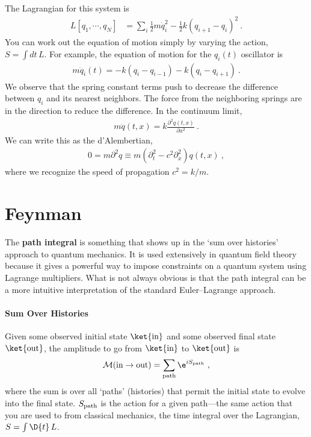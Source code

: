 The Lagrangian  for this system is
\begin{align}
    L[q_1,\cdots, q_N]
    &= 
    \sum_i \frac{1}{2} m \dot q_i^2 - \frac{1}{2}k (q_{i+1}-q_i)^2 \ .
\end{align}
You can work out the equation of motion simply by varying the action, $S=\int dt\,L$. For example, the equation of motion for the $q_i(t)$ oscillator is
\begin{align}
    m\ddot{q}_i(t) = -k(q_{i}-q_{i-1}) -k(q_{i}-q_{i+1}) \ .
\end{align}
We observe that the spring constant terms push to decrease the difference between $q_i$ and its nearest neighbors. The force from the neighboring springs are in the direction to reduce the difference. In the continuum limit,
\begin{align}
    m\ddot{q}(t,x) = k\frac{\partial^2{q(t,x)}}{\partial{x}^2} \ .
\end{align}
We can write this as the d'Alembertian,
\begin{align}
    0 = m \partial^2 q \equiv m\left(\partial_t^2 - c^2 \partial_x^2\right) q(t,x) \ ,
\end{align}
where we recognize the speed of propagation $c^2 = k/m$.





\section{Feynman}

The \textbf{path integral} is something that shows up in the `sum over histories' approach to quantum mechanics. It is used extensively in quantum field theory because it gives a powerful way to impose constraints on a quantum system using Lagrange multipliers. What is not always obvious is that the path integral can be a more intuitive interpretation of the standard Euler--Lagrange approach. 

\paragraph{Sum Over Histories}
% 

\begin{newrule}
Given some observed initial state $\ket{\text{in}}$ and some observed final state $\ket{\text{out}}$, the amplitude to go from $\ket{\text{in}}$ to $\ket{\text{out}}$ is
\begin{align}
    \mathcal M(\text{in}\to\text{out})= 
    \sum_\textnormal{path} \e^{iS_\textnormal{path}} \ ,
\end{align}
where the sum is over all `paths' (histories) that permit the initial state to evolve into the final state. $S_\textnormal{path}$ is the action for a given path---the same action that you are used to from classical mechanics, the time integral over the Lagrangian, $S= \int \D{t}\, L$.
\end{newrule}

